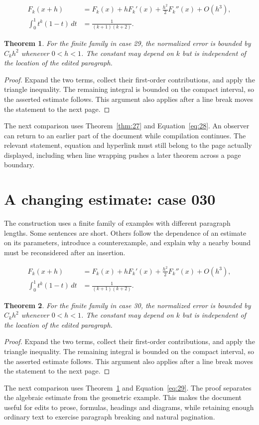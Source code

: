 \documentclass[a4paper,10pt]{article}
\newtheorem{theorem}{Theorem}[section]
\begin{document}
\lipsum[25-26]
\begin{align}\label{eq:28}
 F_k(x+h)&=F_k(x)+hF_k'(x)+\frac{h^2}{2}F_k''(x)+O(h^3),\\
 \int_0^1 t^k(1-t)\,dt&=\frac{1}{(k+1)(k+2)}.
\end{align}
\begin{theorem}\label{thm:28}
For the finite family in case 29, the normalized error is bounded by $C_k h^2$ whenever $0<h<1$. The constant may depend on $k$ but is independent of the location of the edited paragraph.
\end{theorem}
\begin{proof}
Expand the two terms, collect their first-order contributions, and apply the
triangle inequality. The remaining integral is bounded on the compact interval,
so the asserted estimate follows. This argument also applies after a line break
moves the statement to the next page.
\end{proof}
The next comparison uses Theorem~\ref{thm:27} and Equation~\ref{eq:28}. An observer can return to an earlier part of the document while compilation continues. The relevant statement, equation and hyperlink must still belong to the page actually displayed, including when line wrapping pushes a later theorem across a page boundary.

\lipsum[18]

\section{A changing estimate: case 030}\label{unit:29}
The construction uses a finite family of examples with different paragraph lengths. Some sentences are short. Others follow the dependence of an estimate on its parameters, introduce a counterexample, and explain why a nearby bound must be reconsidered after an insertion.

\lipsum[28-29]
\begin{align}\label{eq:29}
 F_k(x+h)&=F_k(x)+hF_k'(x)+\frac{h^2}{2}F_k''(x)+O(h^3),\\
 \int_0^1 t^k(1-t)\,dt&=\frac{1}{(k+1)(k+2)}.
\end{align}
\begin{theorem}\label{thm:29}
For the finite family in case 30, the normalized error is bounded by $C_k h^2$ whenever $0<h<1$. The constant may depend on $k$ but is independent of the location of the edited paragraph.
\end{theorem}
\begin{proof}
Expand the two terms, collect their first-order contributions, and apply the
triangle inequality. The remaining integral is bounded on the compact interval,
so the asserted estimate follows. This argument also applies after a line break
moves the statement to the next page.
\end{proof}
The next comparison uses Theorem~\ref{thm:28} and Equation~\ref{eq:29}. The proof separates the algebraic estimate from the geometric example. This makes the document useful for edits to prose, formulas, headings and diagrams, while retaining enough ordinary text to exercise paragraph breaking and natural pagination.
\end{document}
